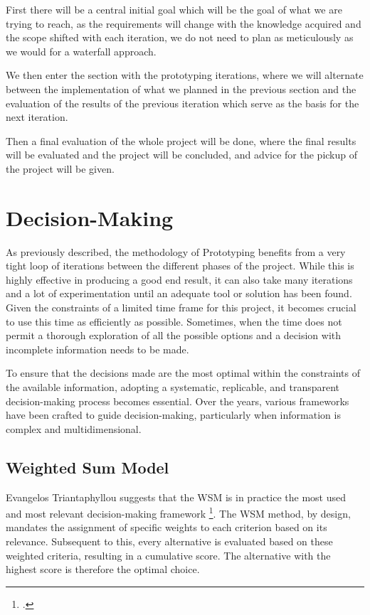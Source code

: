 First there will be a central initial goal which will be the goal of what we are trying to reach,
as the requirements will change with the knowledge acquired and the scope shifted with each iteration,
we do not need to plan as meticulously as we would for a waterfall approach.

We then enter the section with the prototyping iterations, 
where we will alternate between the implementation of what we planned in the previous section and
the evaluation of the results of the previous iteration which serve as the basis for the next iteration.
 
Then a final evaluation of the whole project will be done, where the final results will be evaluated and the project will be concluded,
and advice for the pickup of the project will be given.

\section{Decision-Making}
\label{decision_making}

As previously described, the methodology of Prototyping benefits from a very tight loop of iterations between the different phases of the project.
While this is highly effective in producing a good end result, it can also take many iterations and a lot of experimentation until an adequate tool or solution has been found.
Given the constraints of a limited time frame for this project, it becomes crucial to use this time as efficiently as possible.
Sometimes, when the time does not permit a thorough exploration of all the possible options and a decision with incomplete information needs to be made.
 
To ensure that the decisions made are the most optimal within the constraints of the available information, adopting a systematic, replicable, and transparent decision-making process becomes essential. Over the years, various frameworks have been crafted to guide decision-making, 
particularly when information is complex and multidimensional.

\subsection{Weighted Sum Model}
Evangelos Triantaphyllou suggests that the \ac{WSM} is in practice the most used and most relevant decision-making framework \footcite[p. 1]{triantaphyllouIntroductionMultiCriteriaDecision2000}.
The \ac{WSM} method, by design, mandates the assignment of specific weights to each criterion based on its relevance. Subsequent to this, every alternative is evaluated based on these weighted criteria, resulting in a cumulative score.
The alternative with the highest score is therefore the optimal choice.


